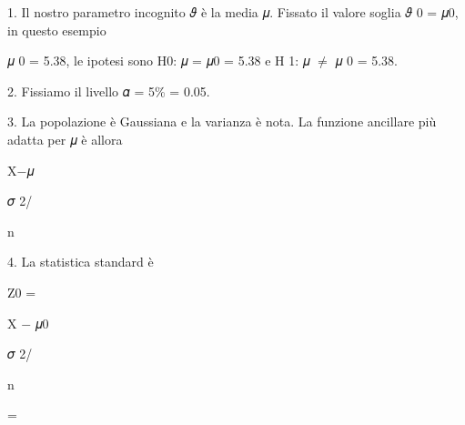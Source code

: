\documentclass[a4paper,portrait,12pt]{article}
\begin{document}
\begin{flushleft}
1. Il nostro parametro incognito 𝜗 \`{e} la media 𝜇. Fissato il valore soglia 𝜗 0 = 𝜇0, in questo esempio
\end{flushleft}


\begin{flushleft}
𝜇 0 = 5.38, le ipotesi sono H0: 𝜇 = 𝜇0 = 5.38 e H 1: 𝜇 $\neq$ 𝜇 0 = 5.38.
\end{flushleft}


\begin{flushleft}
2. Fissiamo il livello 𝛼 = 5\% = 0.05.
\end{flushleft}


\begin{flushleft}
3. La popolazione \`{e} Gaussiana e la varianza \`{e} nota. La funzione ancillare più adatta per 𝜇 \`{e} allora
\end{flushleft}


\begin{flushleft}
X$-$𝜇
\end{flushleft}


\begin{flushleft}
𝜎 2/
\end{flushleft}


\begin{flushleft}
n
\end{flushleft}





\begin{flushleft}
4. La statistica standard \`{e}
\end{flushleft}


\begin{flushleft}
Z0 =
\end{flushleft}





\begin{flushleft}
X $-$ 𝜇0
\end{flushleft}


\begin{flushleft}
𝜎 2/
\end{flushleft}


\begin{flushleft}
n
\end{flushleft}





=
\end{document}
